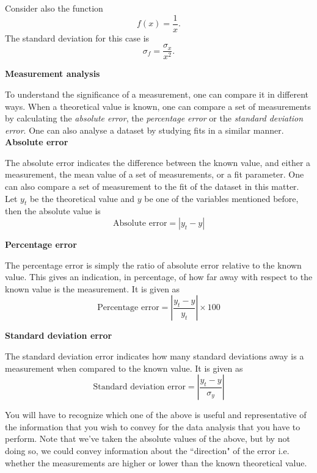 \documentclass[12pt]{report}
\begin{document}
Consider also the function
\begin{equation}
f(x) = \frac{1}{x}.
\label{Eq:f=1/x}
\end{equation}
The standard deviation for this case is
\begin{equation}
\sigma_f = \frac{\sigma_x}{x^2}.
\label{Eq:1/x error}
\end{equation}


\noindent \large \textbf{Measurement analysis} \normalsize

To understand the significance of a measurement, one can compare it in different ways. When a theoretical value is known, one can compare a set of measurements by calculating the \textit{absolute error}, the \textit{percentage error} or the \textit{standard deviation error}. One can also analyse a dataset by studying fits in a similar manner. \\

\noindent \textbf{Absolute error}

The absolute error indicates the difference between the known value, and either a measurement, the mean value of a set of measurements, or a fit parameter. One can also compare a set of measurement to the fit of the dataset in this matter. Let $y_t$ be the theoretical value and $y$ be one of the variables mentioned before, then the absolute value is
\begin{equation}
\text{Absolute error} = \left\rvert y_t - y \right\rvert
\end{equation}

\noindent \textbf{Percentage error}

The percentage error is simply the ratio of absolute error relative to the known value. This gives an indication, in percentage, of how far away with respect to the known value is the measurement. It is given as
\begin{equation}
\text{Percentage error} = \left\rvert \frac{y_t - y}{y_t} \right\rvert \times 100
\end{equation}

\noindent \textbf{Standard deviation error}

The standard deviation error indicates how many standard deviations away is a measurement when compared to the known value. It is given as
\begin{equation}
\text{Standard deviation error} = \left\rvert \frac{y_t - y}{\sigma_y} \right\rvert
\end{equation}

You will have to recognize which one of the above is useful and representative of the information that you wish to convey for the data analysis that you have to perform. Note that we've taken the absolute values of the above, but by not doing so, we could convey information about the ``direction" of the error i.e. whether the measurements are higher or lower than the known theoretical value.\\
\end{document}
